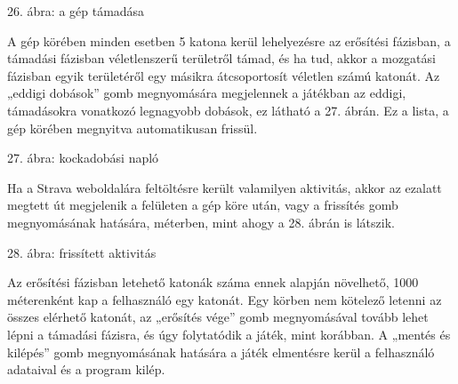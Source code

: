 26. ábra: a gép támadása  

A gép körében minden esetben 5 katona kerül lehelyezésre az erősítési fázisban, a támadási fázisban véletlenszerű területről támad, és ha tud, akkor a mozgatási fázisban egyik területéről egy másikra átcsoportosít véletlen számú katonát. Az „eddigi dobások” gomb megnyomására megjelennek a játékban az eddigi, támadásokra vonatkozó legnagyobb dobások, ez látható a 27. ábrán. Ez a lista, a gép körében megnyitva automatikusan frissül. 

 

27. ábra: kockadobási napló 

Ha a Strava weboldalára feltöltésre került valamilyen aktivitás, akkor az ezalatt megtett út megjelenik a felületen a gép köre után, vagy a frissítés gomb megnyomásának hatására, méterben, mint ahogy a 28. ábrán is látszik. 

 

28. ábra: frissített aktivitás 

Az erősítési fázisban letehető katonák száma ennek alapján növelhető, 1000 méterenként kap a felhasználó egy katonát. Egy körben nem kötelező letenni az összes elérhető katonát, az „erősítés vége” gomb megnyomásával tovább lehet lépni a támadási fázisra, és úgy folytatódik a játék, mint korábban. A „mentés és kilépés” gomb megnyomásának hatására a játék elmentésre kerül a felhasználó adataival és a program kilép. 